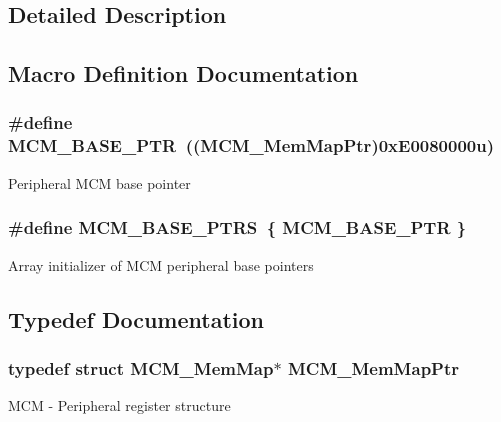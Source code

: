\subsection{Detailed Description}


\subsection{Macro Definition Documentation}
\hypertarget{group___m_c_m___peripheral_gad41e931f176c230831e3dbad45117841}{}
\subsubsection[{M\+C\+M\+\_\+\+B\+A\+S\+E\+\_\+\+P\+T\+R}]{\setlength{\rightskip}{0pt plus 5cm}\#define M\+C\+M\+\_\+\+B\+A\+S\+E\+\_\+\+P\+T\+R~(({\bf M\+C\+M\+\_\+\+Mem\+Map\+Ptr})0x\+E0080000u)}\label{group___m_c_m___peripheral_gad41e931f176c230831e3dbad45117841}
Peripheral M\+C\+M base pointer \hypertarget{group___m_c_m___peripheral_gae2d5e838ce7d2d4108738c05bf224272}{}
\subsubsection[{M\+C\+M\+\_\+\+B\+A\+S\+E\+\_\+\+P\+T\+R\+S}]{\setlength{\rightskip}{0pt plus 5cm}\#define M\+C\+M\+\_\+\+B\+A\+S\+E\+\_\+\+P\+T\+R\+S~\{ {\bf M\+C\+M\+\_\+\+B\+A\+S\+E\+\_\+\+P\+T\+R} \}}\label{group___m_c_m___peripheral_gae2d5e838ce7d2d4108738c05bf224272}
Array initializer of M\+C\+M peripheral base pointers 

\subsection{Typedef Documentation}
\hypertarget{group___m_c_m___peripheral_ga72e8bbe428d9410917903164d3a5f675}{}
\subsubsection[{M\+C\+M\+\_\+\+Mem\+Map\+Ptr}]{\setlength{\rightskip}{0pt plus 5cm}typedef struct {\bf M\+C\+M\+\_\+\+Mem\+Map}$\ast$ {\bf M\+C\+M\+\_\+\+Mem\+Map\+Ptr}}\label{group___m_c_m___peripheral_ga72e8bbe428d9410917903164d3a5f675}
M\+C\+M -\/ Peripheral register structure 